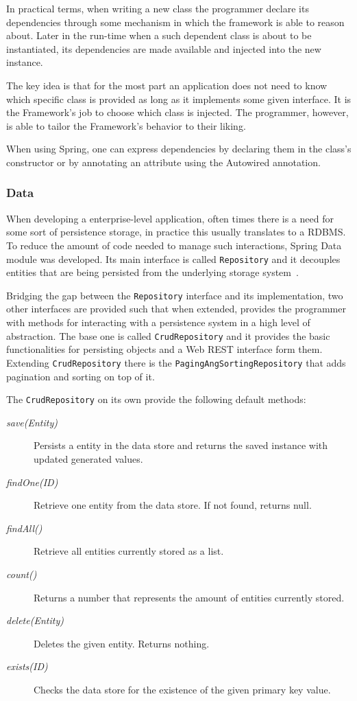 In practical terms, when writing a new class the programmer declare its dependencies through some mechanism in which the framework is able to reason about. Later in the run-time when a such dependent class is about to be instantiated, its dependencies are made available and injected into the new instance.

The key idea is that for the most part an application does not need to know which specific class is provided as long as it implements some given interface. It is the Framework's job to choose which class is injected. The programmer, however, is able to tailor the Framework's behavior to their liking.

When using Spring, one can express dependencies by declaring them in the class's constructor or by annotating an attribute using the Autowired annotation\cite{springdi}.

\subsubsection{Data}
When developing a enterprise-level application, often times there is a need for some sort of persistence storage, in practice this usually translates to a \gls{RDBMS}. To reduce the amount of code needed to manage such interactions, Spring Data module was developed. Its main interface is called \texttt{Repository} and it decouples entities that are being persisted from the underlying storage system~\cite{springdata}.

Bridging the gap between the \texttt{Repository} interface and its implementation, two other interfaces are provided such that when extended, provides the programmer with methods for interacting with a persistence system in a high level of abstraction. The base one is called \texttt{CrudRepository} and it provides the basic functionalities for persisting objects and a Web \gls{REST} interface form them. Extending \texttt{CrudRepository} there is the \texttt{PagingAngSortingRepository} that adds pagination and sorting on top of it.

The \texttt{CrudRepository} on its own provide the following default methods:
\begin{description}
\item[\textit{save(Entity)}] Persists a entity in the data store and returns the saved instance with updated generated values.
\item[\textit{findOne(ID)}] Retrieve one entity from the data store. If not found, returns null.
\item[\textit{findAll()}] Retrieve all entities currently stored as a list.
\item[\textit{count()}] Returns a number that represents the amount of entities currently stored.
\item[\textit{delete(Entity)}] Deletes the given entity. Returns nothing.
\item[\textit{exists(ID)}] Checks the data store for the existence of the given primary key value.
\end{description}

